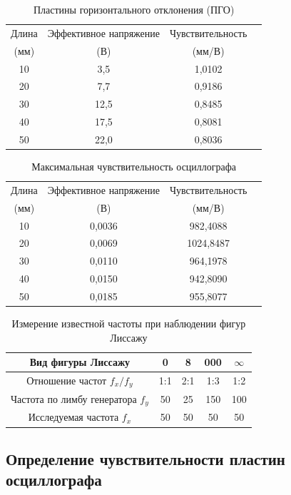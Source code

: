 \begin{table}[H]
\centering
\caption{Пластины горизонтального отклонения (ПГО)}
\label{tab:pgo}
\begin{tabular}{|c|c|c|c|}
\hline
Длина & Эффективное напряжение & Чувствительность \\
(мм) & (В) & (мм/В) \\
\hline
10 & 3,5 & 1,0102 \\
\hline
20 & 7,7 & 0,9186 \\
\hline
30 & 12,5 & 0,8485 \\
\hline
40 & 17,5 & 0,8081 \\
\hline
50 & 22,0 & 0,8036 \\
\hline
\end{tabular}
\end{table}

\begin{table}[H]
\centering
\caption{Максимальная чувствительность осциллографа}
\label{tab:distribution}
\begin{tabular}{|c|c|c|c|}
\hline
Длина & Эффективное напряжение & Чувствительность \\
(мм) & (В) & (мм/В) \\
\hline
10 & 0,0036 & 982,4088 \\
\hline
20 & 0,0069 & 1024,8487 \\
\hline
30 & 0,0110 & 964,1978 \\
\hline
40 & 0,0150 & 942,8090 \\
\hline
50 & 0,0185 & 955,8077 \\
\hline
\end{tabular}
\end{table}



\begin{table}[H]
\centering
\caption{Измерение известной частоты при наблюдении фигур Лиссажу}
\label{tab:distribution}
\begin{tabular}{|c|c|c|c|c|}
\hline
Вид фигуры Лиссажу & 0 & 8 & 000 & $\infty$ \\
\hline
Отношение частот $f_x / f_y$ & 1:1 & 2:1 & 1:3 & 1:2\\
\hline
Частота по лимбу генератора $f_y$ & 50 & 25 & 150 & 100\\
\hline
Исследуемая частота $f_x$ & 50 & 50 & 50 & 50\\
\hline
\end{tabular}
\end{table}

\subsection*{Определение чувствительности пластин осциллографа}

